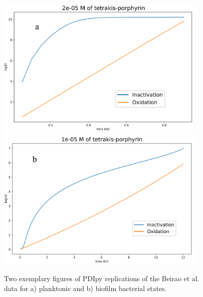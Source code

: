 \begin{figure}
    \centering
    \includegraphics[width = 0.9\textwidth]{images/PDIpy/examples/20uM.png}
    \vspace{5mm}
    \midrule
    \vspace{5mm}
    \includegraphics[width = 0.9\textwidth]{images/PDIpy/examples/10uM_biofilm.png}
    \caption{
        Two exemplary figures of PDIpy replications of the Beirao et al. data for a) planktonic and b) biofilm bacterial states.
    }
    \label{beirao_et_al}
\end{figure}

